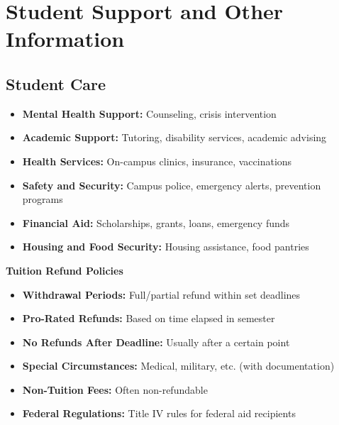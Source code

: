 \section{Student Support and Other Information}

\subsection{Student Care}
\begin{itemize}
    \item \textbf{Mental Health Support:} Counseling, crisis intervention
    \item \textbf{Academic Support:} Tutoring, disability services, academic advising
    \item \textbf{Health Services:} On-campus clinics, insurance, vaccinations
    \item \textbf{Safety and Security:} Campus police, emergency alerts, prevention programs
    \item \textbf{Financial Aid:} Scholarships, grants, loans, emergency funds
    \item \textbf{Housing and Food Security:} Housing assistance, food pantries
\end{itemize}

\textbf{Tuition Refund Policies}
\begin{itemize}
    \item \textbf{Withdrawal Periods:} Full/partial refund within set deadlines
    \item \textbf{Pro-Rated Refunds:} Based on time elapsed in semester
    \item \textbf{No Refunds After Deadline:} Usually after a certain point
    \item \textbf{Special Circumstances:} Medical, military, etc. (with documentation)
    \item \textbf{Non-Tuition Fees:} Often non-refundable
    \item \textbf{Federal Regulations:} Title IV rules for federal aid recipients
\end{itemize}

